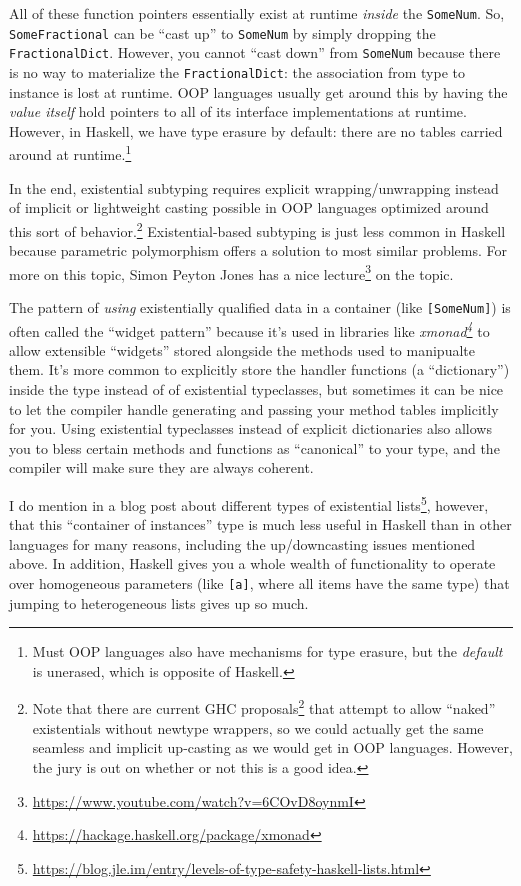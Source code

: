 \documentclass[]{article}
\renewcommand{\href}[2]{#2\footnote{\url{#1}}}
\begin{document}
All of these function pointers essentially exist at runtime \emph{inside} the
\texttt{SomeNum}. So, \texttt{SomeFractional} can be ``cast up'' to
\texttt{SomeNum} by simply dropping the \texttt{FractionalDict}. However, you
cannot ``cast down'' from \texttt{SomeNum} because there is no way to
materialize the \texttt{FractionalDict}: the association from type to instance
is lost at runtime. OOP languages usually get around this by having the
\emph{value itself} hold pointers to all of its interface implementations at
runtime. However, in Haskell, we have type erasure by default: there are no
tables carried around at runtime.\footnote{Must OOP languages also have
  mechanisms for type erasure, but the \emph{default} is unerased, which is
  opposite of Haskell.}

In the end, existential subtyping requires explicit wrapping/unwrapping instead
of implicit or lightweight casting possible in OOP languages optimized around
this sort of behavior.\footnote{Note that there are current
  \href{https://github.com/ghc-proposals/ghc-proposals/pull/473}{GHC proposals}
  that attempt to allow ``naked'' existentials without newtype wrappers, so we
  could actually get the same seamless and implicit up-casting as we would get
  in OOP languages. However, the jury is out on whether or not this is a good
  idea.} Existential-based subtyping is just less common in Haskell because
parametric polymorphism offers a solution to most similar problems. For more on
this topic, Simon Peyton Jones has
\href{https://www.youtube.com/watch?v=6COvD8oynmI}{a nice lecture} on the topic.

The pattern of \emph{using} existentially qualified data in a container (like
\texttt{{[}SomeNum{]}}) is often called the ``widget pattern'' because it's used
in libraries like
\emph{\href{https://hackage.haskell.org/package/xmonad}{xmonad}} to allow
extensible ``widgets'' stored alongside the methods used to manipualte them.
It's more common to explicitly store the handler functions (a ``dictionary'')
inside the type instead of of existential typeclasses, but sometimes it can be
nice to let the compiler handle generating and passing your method tables
implicitly for you. Using existential typeclasses instead of explicit
dictionaries also allows you to bless certain methods and functions as
``canonical'' to your type, and the compiler will make sure they are always
coherent.

I do mention in
\href{https://blog.jle.im/entry/levels-of-type-safety-haskell-lists.html}{a blog
post about different types of existential lists}, however, that this ``container
of instances'' type is much less useful in Haskell than in other languages for
many reasons, including the up/downcasting issues mentioned above. In addition,
Haskell gives you a whole wealth of functionality to operate over homogeneous
parameters (like \texttt{{[}a{]}}, where all items have the same type) that
jumping to heterogeneous lists gives up so much.
\end{document}
